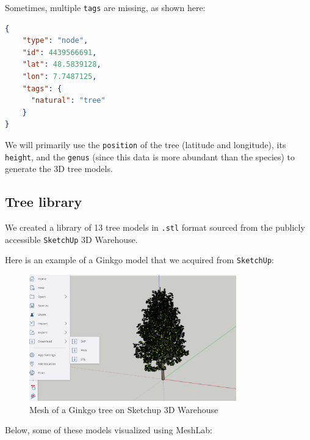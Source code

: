 \documentclass[12pt]{article}
\begin{document}
Sometimes, multiple \texttt{tags} are missing, as shown here:

\begin{lstlisting}[language=json]
{
    "type": "node",
    "id": 4439566691,
    "lat": 48.5839128,
    "lon": 7.7487125,
    "tags": {
      "natural": "tree"
    }
}
\end{lstlisting}

We will primarily use the \texttt{position} of the tree (latitude and
longitude), its \texttt{height}, and the \texttt{genus} (since this data is
more abundant than the species) to generate the 3D tree models.

\subsection{Tree library}
We created a library of 13 tree models in \texttt{.stl} format sourced from
the publicly accessible \texttt{SketchUp}\cite{sketchup} 3D Warehouse.

Here is an example of a Ginkgo model that we acquired from \texttt{SketchUp}:

\begin{figure}[H]
    \centering
        \centering
        \includegraphics[width=0.8\textwidth]{images/ginkgo_sketchup.png}
        \caption{Mesh of a Ginkgo tree on Sketchup 3D Warehouse}
\end{figure}

\newpage

Below, some of these models visualized using MeshLab\cite{meshlab}:
\end{document}
